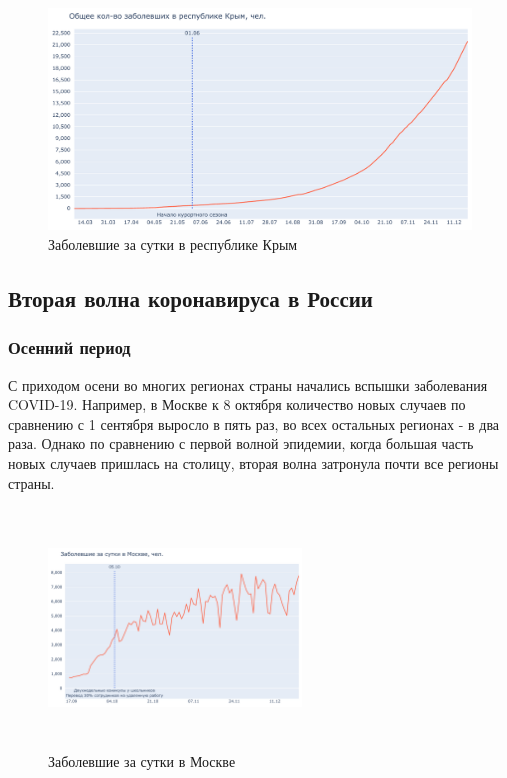 \documentclass[a4paper, 12pt]{extarticle}
\begin{document}
\begin{figure}[h]
    \centering
    \includegraphics[scale=0.5]{../plots/9republic_of_crimea.pdf}
    \caption{Заболевшие за сутки в республике Крым}
    \label{fig:total_confirmed_crimea}
\end{figure}
\newpage

\subsection{Вторая волна коронавируса в России}
\subsubsection{Осенний период}

С приходом осени во многих регионах страны начались вспышки заболевания COVID-19. Например, в Москве к 8 октября количество новых случаев по сравнению с 1 сентября выросло в пять раз, во всех остальных регионах - в два раза. Однако по сравнению с первой волной эпидемии, когда большая часть новых случаев пришлась на столицу, вторая волна затронула почти все регионы страны.
\\

\begin{figure}
    \centering
    \vspace{-15pt}
    \includegraphics[height=180pt, width=0.6\textwidth]{../plots/7daily_confirmed_with_events_moscow_2.pdf}
    \caption{Заболевшие за сутки в Москве}
    \label{fig:day_confirmed_moscow_with_events}
\end{figure}
\end{document}
